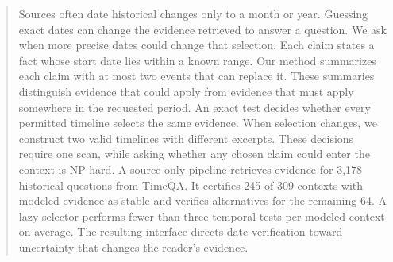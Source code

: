 \begin{abstract}
Sources often date historical changes only to a month or year.
Guessing exact dates can change the evidence retrieved to answer a question.
We ask when more precise dates could change that selection.
Each claim states a fact whose start date lies within a known range.
Our method summarizes each claim with at most two events that can replace it.
These summaries distinguish evidence that could apply from evidence that must apply somewhere in the requested period.
An exact test decides whether every permitted timeline selects the same evidence.
When selection changes, we construct two valid timelines with different excerpts.
These decisions require one scan, while asking whether any chosen claim could enter the context is NP-hard.
A source-only pipeline retrieves evidence for 3,178 historical questions from TimeQA.
It certifies 245 of 309 contexts with modeled evidence as stable and verifies alternatives for the remaining 64.
A lazy selector performs fewer than three temporal tests per modeled context on average.
The resulting interface directs date verification toward uncertainty that changes the reader's evidence.
\end{abstract}
